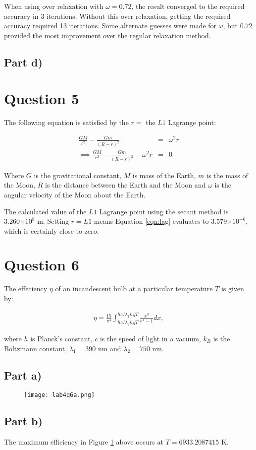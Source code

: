 \documentclass[a4paper,12pt]{article}
\providecommand{\e}[1]{\ensuremath{\times 10^{#1}}}
\begin{document}
When using over relaxation with $\omega = 0.72$, the result converged to the required accuracy in 3 iterations. Without this over relaxation, getting the required accuracy required 13 iterations. Some alternate guesses were made for $\omega$, but $0.72$ provided the most improvement over the regular relaxation method.

\subsection{Part d)}



\section{Question 5}

The following equation is satisfied by the $r =$ the $L1$ Lagrange point:

\begin{eqnarray}
\frac{GM}{r^2} - \frac{Gm}{(R-r)^2} &=& \omega^2r\nonumber\\
\implies \frac{GM}{r^2} - \frac{Gm}{(R-r)^2} - \omega^2r &=& 0
\label{eqn:lag}
\end{eqnarray}

Where $G$ is the gravitational constant, $M$ is mass of the Earth, $m$ is the mass of the Moon, $R$ is the distance between the Earth and the Moon and $\omega$ is the angular velocity of the Moon about the Earth.

The calculated value of the $L1$ Lagrange point using the secant method is $3.260\e{8}$ m. Setting $r = L1$ means Equation \ref{eqn:lag} evaluates to $3.579\e{-6}$, which is certainly close to zero.

\section{Question 6}

The effeciency $\eta$ of an incandescent bulb at a particular temperature $T$ is given by:

\begin{eqnarray}
\eta = \frac{15}{\pi^4}\int_{hc/\lambda_2 k_B T}^{hc/\lambda_1 k_B T} \frac{x^3}{e^x - 1} dx,\nonumber
\end{eqnarray}

where $h$ is Planck's constant, $c$ is the speed of light in a vacuum, $k_B$ is the Boltzmann constant, $\lambda_1 = 390$ nm and $\lambda_2 = 750$ nm.

\subsection{Part a)}

\begin{figure}[H]
\centering
\texttt{[image: lab4q6a.png]}
\caption{}
\label{fig:q6}
\end{figure}

\subsection{Part b)}

The maximum efficiency in Figure \ref{fig:q6} above occurs at $T = 6933.2087415$ K.
\end{document}
